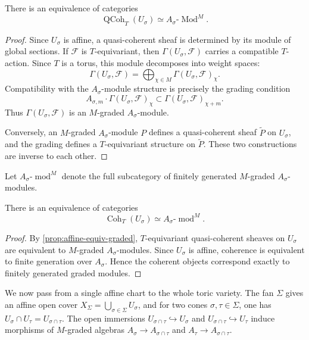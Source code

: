 \begin{proposition}\label{prop:affine-equiv-graded}
There is an equivalence of categories
\[
\operatorname{QCoh}_T(U_\sigma)
\simeq
A_\sigma\text{-}\operatorname{Mod}^{M}.
\]
\end{proposition}

\begin{proof}
Since \(U_\sigma\) is affine, a quasi-coherent sheaf is determined by its
module of global sections.  If \(\mathcal F\) is \(T\)-equivariant, then
\(\Gamma(U_\sigma,\mathcal F)\) carries a compatible \(T\)-action.  Since
\(T\) is a torus, this module decomposes into weight spaces:
\[
\Gamma(U_\sigma,\mathcal F)
=
\bigoplus_{\chi\in M}\Gamma(U_\sigma,\mathcal F)_\chi .
\]
Compatibility with the \(A_\sigma\)-module structure is precisely the
grading condition
\[
A_{\sigma,m}\cdot \Gamma(U_\sigma,\mathcal F)_\chi
\subset
\Gamma(U_\sigma,\mathcal F)_{\chi+m}.
\]
Thus \(\Gamma(U_\sigma,\mathcal F)\) is an \(M\)-graded
\(A_\sigma\)-module.

Conversely, an \(M\)-graded \(A_\sigma\)-module \(P\) defines a
quasi-coherent sheaf \(\widetilde P\) on \(U_\sigma\), and the grading
defines a \(T\)-equivariant structure on \(\widetilde P\).  These two
constructions are inverse to each other.
\end{proof}

Let \(A_\sigma\text{-}\operatorname{mod}^M\) denote the full subcategory
of finitely generated \(M\)-graded \(A_\sigma\)-modules.

\begin{corollary}
There is an equivalence of categories
\[
\operatorname{Coh}_T(U_\sigma)
\simeq
A_\sigma\text{-}\operatorname{mod}^{M}.
\]
\end{corollary}

\begin{proof}
By \cref{prop:affine-equiv-graded}, \(T\)-equivariant
quasi-coherent sheaves on \(U_\sigma\) are equivalent to \(M\)-graded
\(A_\sigma\)-modules.  Since \(U_\sigma\) is affine, coherence is
equivalent to finite generation over \(A_\sigma\).  Hence the coherent
objects correspond exactly to finitely generated graded modules.
\end{proof}



We now pass from a single affine chart to the whole toric variety.  The
fan \(\Sigma\) gives an affine open cover
\(X_\Sigma=\bigcup_{\sigma\in\Sigma}U_\sigma\), and for two cones
\(\sigma,\tau\in\Sigma\), one has
\(U_\sigma\cap U_\tau=U_{\sigma\cap\tau}\).  The open immersions
\(U_{\sigma\cap\tau}\hookrightarrow U_\sigma\) and
\(U_{\sigma\cap\tau}\hookrightarrow U_\tau\) induce morphisms of
\(M\)-graded algebras \(A_\sigma\to A_{\sigma\cap\tau}\) and
\(A_\tau\to A_{\sigma\cap\tau}\).




